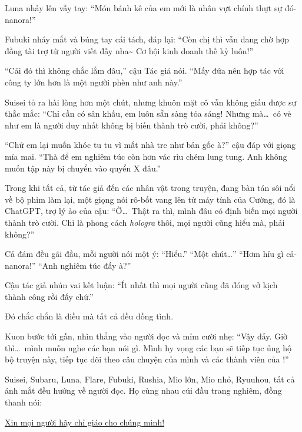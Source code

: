 \documentclass[../main.tex]{subfiles}
\begin{document}
Luna nhảy lên vẫy tay: ``Món bánh kê của em mới là nhân vựt chính thựt sự đó-nanora!''

Fubuki nháy mắt và búng tay cái tách, đáp lại: ``Còn chị thì vẫn đang chờ hợp đồng tài trợ từ người viết đấy nha\~{} Cơ hội kinh doanh thế kỷ luôn!''

``Cái đó thì không chắc lắm đâu,'' cậu Tác giả nói. ``Mấy đứa nên hợp tác với công ty lớn hơn là một người phèn như anh này.''

Suisei tỏ ra hài lòng hơn một chút, nhưng khuôn mặt cô vẫn không giấu được sự thắc mắc: ``Chỉ cần có sân khấu, em luôn sẵn sàng tỏa sáng! Nhưng mà\dots\ có vẻ như em là người duy nhất không bị biến thành trò cười, phải không?''

``Chứ em lại muốn khóc tu tu vì mất nhà tre như bản gốc à?'' cậu đáp với giọng mỉa mai. ``Thà để em nghiêm túc còn hơn vác rìu chém lung tung. Anh không muốn tập này bị chuyển vào quyển X đâu.''

Trong khi tất cả, từ tác giả đến các nhân vật trong truyện, đang bàn tán sôi nổi về bộ phim làm lại, một giọng nói rô-bốt vang lên từ máy tính của Cường, đó là ChatGPT, trợ lý ảo của cậu: ``Ờ\dots\ Thật ra thì, mình đâu có định biến mọi người thành trò cười. Chỉ là phong cách \textit{hologra} thôi, mọi người cũng hiểu mà, phải không?''

Cả đám đều gãi đầu, mỗi người nói một ý: ``Hiểu.'' ``Một chút\dots'' ``Hơm hỉu gì cả-nanora!'' ``Anh nghiêm túc đấy à?''

Cậu tác giả nhún vai kết luận: ``Ít nhất thì mọi người cũng đã đóng vở kịch thành công rồi đấy chứ.''

Đó chắc chắn là điều mà tất cả đều đồng tình.

Kuon bước tới gần, nhìn thẳng vào người đọc và mỉm cười nhẹ: ``Vậy đấy. Giờ thì\dots\ mình muốn nghe các bạn nói gì. Mình hy vọng các bạn sẽ tiếp tục ủng hộ bộ truyện này, tiếp tục dõi theo câu chuyện của mình và các thành viên của \hll!''

Suisei, Subaru, Luna, Flare, Fubuki, Rushia, Mio lớn, Mio nhỏ, Ryuuhou, tất cả ánh mắt đều hướng về người đọc. Họ cùng nhau cúi đầu trang nghiêm, đồng thanh nói:

\begin{center}
    \uline{Xin mọi người hãy chỉ giáo cho chúng mình!}
\end{center}
\end{document}
